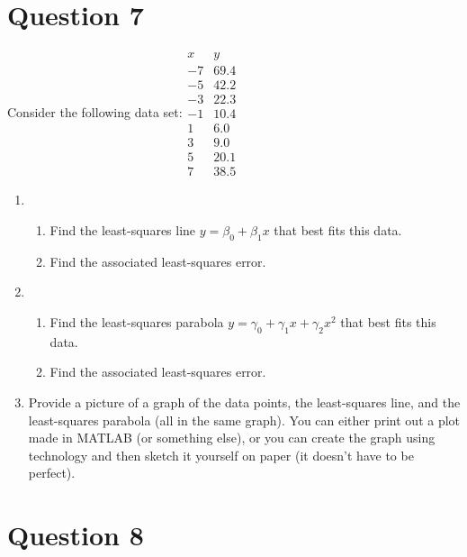 \documentclass{article}
\begin{document}
\section{Question 7}
\item Consider the following data set:\qquad $\begin{array}{r|r}
	x & y\\
	\hline
	-7 & 69.4\\
	-5 & 42.2\\
	-3 & 22.3\\
	-1 & 10.4\\
	1 & 6.0\\
	3 & 9.0\\
	5 & 20.1\\
	7 & 38.5
	\end{array}$
	\begin{enumerate}
		\item \begin{enumerate}
			\item Find the least-squares line $y = \beta_0 + \beta_1 x$ that best fits this data.
			\item Find the associated least-squares error.
		\end{enumerate}
		\item \begin{enumerate}
			\item Find the least-squares parabola $y = \gamma_0 + \gamma_1 x + \gamma_2 x^2$ that best fits this data.
			\item Find the associated least-squares error.
		\end{enumerate}
		\item Provide a picture of a graph of the data points, the least-squares line, and the least-squares parabola (all in the same graph).  You can either print out a plot made in MATLAB (or something else), or you can create the graph using technology and then sketch it yourself on paper (it doesn't have to be perfect).
	\end{enumerate}

\section{Question 8}
\end{document}
